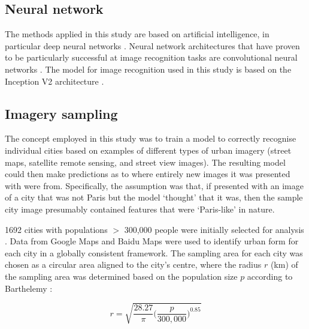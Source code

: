 \documentclass[Crown,sageh,times]{sagej}
\begin{document}
\subsection{Neural network}\label{sec:methods1}

The methods applied in this study are based on artificial intelligence, in particular deep neural networks \cite{Bishop1995,Samarasinghe2016,Graupe2013}. Neural network architectures that have proven to be particularly successful at image recognition tasks are convolutional neural networks \cite{Schmidhuber2015}. The model for image recognition used in this study is based on the Inception V2 architecture \cite{Szegedy2015,Ioffe2015}. 


\subsection{Imagery sampling}\label{sec:methods2}

The concept employed in this study was to train a model to correctly recognise individual cities based on examples of different types of urban imagery (street maps, satellite remote sensing, and street view images). The resulting model could then make predictions as to where entirely new images it was presented with were from. Specifically, the assumption was that, if presented with an image of a city that was not Paris but the model `thought' that it was, then the sample city image presumably contained features that were `Paris-like' in nature. 

1692 cities with populations $>$ 300,000 people were initially selected for analysis \cite{UN2014}. Data from Google Maps and Baidu Maps were used to identify urban form for each city in a globally consistent framework. The sampling area for each city was chosen as a circular area aligned to the city's centre, where the radius $r$ (km) of the sampling area was determined based on the population size $p$ according to Barthelemy \cite{Barthelemy2016}: 

\begin{equation}
r = \sqrt{ \frac{28.27}{\pi} \bigg( \frac{p}{300,000}  \bigg)^{0.85} }
\end{equation}
\end{document}
